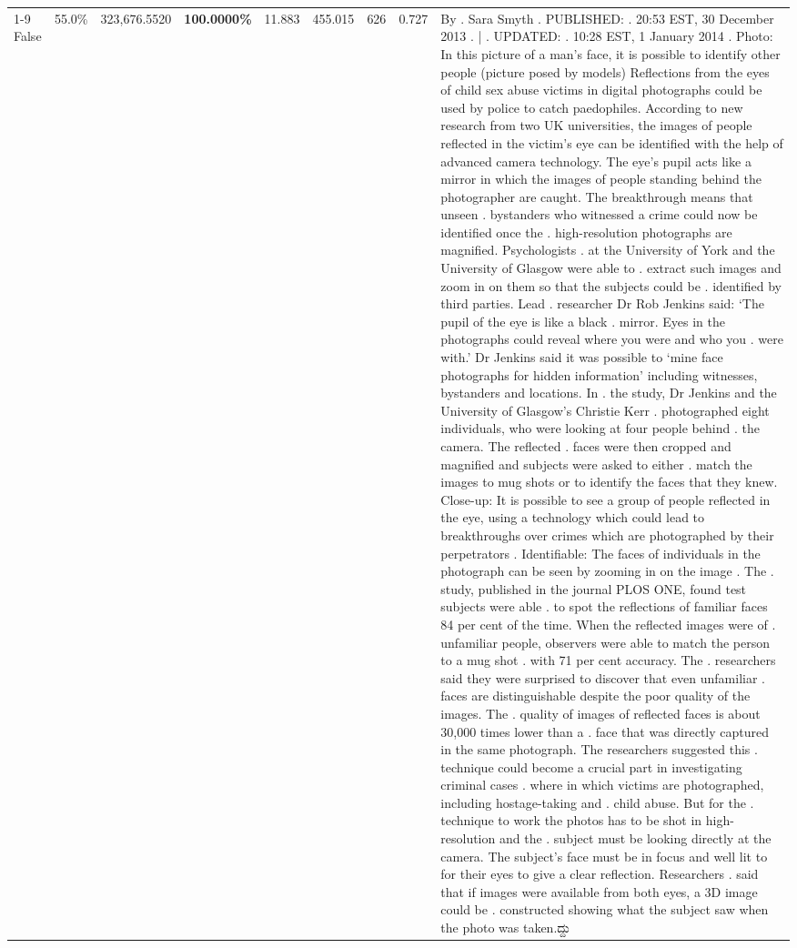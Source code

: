 \begin{table}[H]
\begin{tabular}{lllrlllll}
\cline{1-9}
False & 55.0\% & 323,676.5520 & \bfseries \color{red} 100.0000\% & 11.883 & 455.015 & 626 & 0.727 & By . Sara Smyth . PUBLISHED: . 20:53 EST, 30 December 2013 . | . UPDATED: . 10:28 EST, 1 January 2014 . Photo: In this picture of a man's face, it is possible to identify other people (picture posed by models) Reflections from the eyes of child sex abuse victims in digital photographs could be used by police to catch paedophiles. According to new research from two UK universities, the images of people reflected in the victim's eye can be identified with the help of advanced camera technology. The eye's pupil acts like a mirror in which the images of people standing behind the photographer are caught. The breakthrough means that unseen . bystanders who witnessed a crime could now be identified once the . high-resolution photographs are magnified. Psychologists . at the University of York and the University of Glasgow were able to . extract such images and zoom in on them so that the subjects could be . identified by third parties. Lead . researcher Dr Rob Jenkins said: ‘The pupil of the eye is like a black . mirror. Eyes in the photographs could reveal where you were and who you . were with.' Dr Jenkins said it was possible to ‘mine face photographs for hidden information' including witnesses, bystanders and locations. In . the study, Dr Jenkins and the University of Glasgow's Christie Kerr . photographed eight individuals, who were looking at four people behind . the camera. The reflected . faces were then cropped and magnified and subjects were asked to either . match the images to mug shots or to identify the faces that they knew. Close-up: It is possible to see a group of people reflected in the eye, using a technology which could lead to breakthroughs over crimes which are photographed by their perpetrators . Identifiable: The faces of individuals in the photograph can be seen by zooming in on the image . The . study, published in the journal PLOS ONE, found test subjects were able . to spot the reflections of familiar faces 84 per cent of the time. When the reflected images were of . unfamiliar people, observers were able to match the person to a mug shot . with 71 per cent accuracy. The . researchers said they were surprised to discover that even unfamiliar . faces are distinguishable despite the poor quality of the images. The . quality of images of reflected faces is about 30,000 times lower than a . face that was directly captured in the same photograph. The researchers suggested this . technique could become a crucial part in investigating criminal cases . where in which victims are photographed, including hostage-taking and . child abuse. But for the . technique to work the photos has to be shot in high-resolution and the . subject must be looking directly at the camera. The subject's face must be in focus and well lit to for their eyes to give a clear reflection. Researchers . said that if images were available from both eyes, a 3D image could be . constructed showing what the subject saw when the photo was taken.ದ್ದು \\

\end{tabular}
\end{table}
